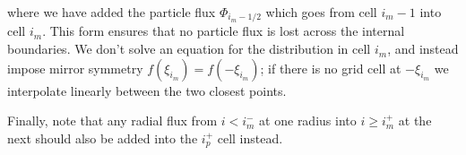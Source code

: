 \documentclass[11pt,a4paper]{article}
\newcommand{\Vp}{\ensuremath{\mathcal{V}'} }
\begin{document}
where we have added the particle flux $\Phi_{i_m-1/2}$ which goes from cell $i_m-1$ into cell $i_m$. This form ensures that no particle flux is lost across the internal boundaries.
We don't solve an equation for the distribution in cell $i_m$, and instead impose mirror symmetry $f(\xi_{i_m}) = f(-\xi_{i_m})$; if there is no grid cell at $-\xi_{i_m}$ we interpolate linearly between the two closest points.

Finally, note that any radial flux from $i<i_m^-$ at one radius into $i\geq i_m^+$ at the next should also be added into the $i_p^+$ cell instead. 
\end{document}
